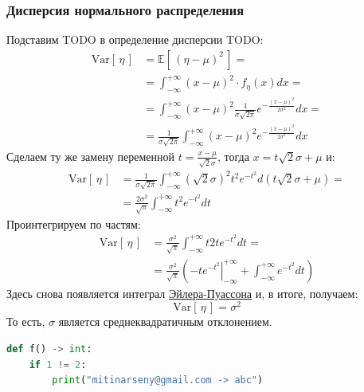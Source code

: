 \documentclass[
  russian,
  a4paper,
  russian]{scrreprt}
\begin{document}
\hypertarget{ux434ux438ux441ux43fux435ux440ux441ux438ux44f-ux43dux43eux440ux43cux430ux43bux44cux43dux43eux433ux43e-ux440ux430ux441ux43fux440ux435ux434ux435ux43bux435ux43dux438ux44f}{%
\subsubsection{Дисперсия нормального
распределения}\label{ux434ux438ux441ux43fux435ux440ux441ux438ux44f-ux43dux43eux440ux43cux430ux43bux44cux43dux43eux433ux43e-ux440ux430ux441ux43fux440ux435ux434ux435ux43bux435ux43dux438ux44f}}

Подставим TODO в определение дисперсии TODO: \[\begin{aligned}
    \mathrm{Var}\left[\, \eta \,\right] &= \mathbb{E}\left[\, (\eta - \mu)^2 \,\right] =\\
               &= \int_{-\infty}^{+\infty} (x-\mu)^2 \cdot f_{\eta}(x)dx =\\
               &= \int_{-\infty}^{+\infty}(x-\mu)^2 \frac{1}{\sigma\sqrt{2\pi}}e^{-\frac{(x-\mu)^2}{2\sigma^2}}dx =\\
               &= \frac{1}{\sigma\sqrt{2\pi}}\int_{-\infty}^{+\infty}(x-\mu)^2 e^{-\frac{(x-\mu)^2}{2\sigma^2}}dx
\end{aligned}\] Сделаем ту же замену переменной
\(t = \frac{x-\mu}{\sqrt{2}\sigma}\), тогда \(x = t\sqrt{2}\sigma+\mu\)
и: \[\begin{aligned}
    \mathrm{Var}\left[\, \eta \,\right] &= \frac{1}{\sigma\sqrt{2\pi}}
                \int_{-\infty}^{+\infty}(\sqrt{2}\sigma)^2 t^2 e^{-t^2}d(t\sqrt{2}\sigma+\mu) =\\
               &= \frac{2\sigma^2}{\sqrt{\pi}}\int_{-\infty}^{+\infty}t^2 e^{-t^2}dt
\end{aligned}\] Проинтегрируем по частям: \[\begin{aligned}
    \mathrm{Var}\left[\, \eta \,\right] &= \frac{\sigma^2}{\sqrt{\pi}}\int_{-\infty}^{+\infty}t 2t e^{-t^2} dt =\\
               &= \frac{\sigma^2}{\sqrt{\pi}}\left(\left. -t e^{-t^2} \right|_{-\infty}^{+\infty}
                 + \int_{-\infty}^{+\infty}e^{-t^2}dt\right)
\end{aligned}\] Здесь снова появляется интеграл
\href{https://ru.wikipedia.org/wiki/Гауссов_интеграл}{Эйлера-Пуассона}
и, в итоге, получаем: \[\boxed{
    \mathrm{Var}\left[\, \eta \,\right] = \sigma^2
}\] То есть, \(\sigma\) является среднеквадратичным отклонением.

\begin{lstlisting}[language=Python]
def f() -> int:
    if 1 != 2:
        print("mitinarseny@gmail.com -> abc")
\end{lstlisting}
\end{document}
